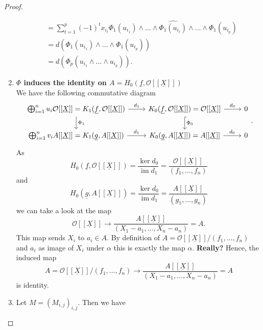\documentclass{article}
\theoremstyle{plain}%
\theoremstyle{definition}
\theoremstyle{remark}
\newcommand{\im}{\operatorname{im}}
\begin{document}
\begin{proof}
\begin{enumerate}
\begin{align*}
                &= \sum_{t=1}^p(-1)^t x_{i_t}\Phi_1(u_{i_1})\!\wedge\!\dots\!
                \wedge\widehat{\Phi_1(u_{i_t})}\!\wedge\!\dots\!\wedge\!\Phi_1(u_{i_p})\\
                &= d(\Phi_1(u_{i_1})\wedge\dots\wedge \Phi_1(u_{i_p}))\\
                &= d(\Phi_p(u_{i_1}\wedge\dots\wedge u_{i_p})).
            \end{align*}
            \item \textbf{\(\Phi\) induces the identity on \(A = H_0(\underline{f}, \mathcal{O}[[\underline{X}]])\)}\\
            We have the following commutative diagram
            \[
                \begin{tikzcd}
                    \bigoplus_{i=1}^n u_i \mathcal{O}[[\underline{X}]] = K_1(\underline{f}, \mathcal{O}[[\underline{X}]]) 
                    \arrow[r, "d_1"] \arrow[d, "\Phi_1"] & K_0(\underline{f}, \mathcal{O}[[\underline{X}]]) \arrow[r, "d_0"] \arrow[d, hook, "\Phi_0"] = \mathcal{O}[[\underline{X}]] & 0\\
                    \bigoplus_{i=1}^n v_i A[[\underline{X}]] = K_1(\underline{g}, A[[\underline{X}]]) 
                    \arrow[r, "d_1"] & K_0(\underline{g}, A[[\underline{X}]]) = A[[\underline{X}]] \arrow[r, "d_0"] & 0
                \end{tikzcd}.
            \]
            As 
            \[
                H_0(\underline{f}, \mathcal{O}[[\underline{X}]]) = \frac{\ker d_0}{\im d_1} 
                = \frac{\mathcal{O}[[\underline{X}]]}{(f_1, \dots, f_n)}
            \] and
            \[
                H_0(\underline{g}, A[[\underline{X}]]) = \frac{\ker d_0}{\im d_1} 
                = \frac{A[[\underline{X}]]}{(g_1, \dots, g_n)}
            \]
            we can take a look at the map
            \[
                \mathcal{O}[[\underline{X}]] \to \frac{A[[\underline{X}]]}{(X_1 - a_1, \dots, X_n - a_n)} = A.
            \]
            This map sends \(X_i\) to \(a_i \in A\).
            By definition of \(A = \mathcal{O}[[\underline{X}]]/(f_1, \dots, f_n)\) and \(a_i\) as image of \(X_i\)
            under \(\alpha\) this is exactly the map \(\alpha\). \textbf{Really?} Hence, the induced map
            \[
                A = \mathcal{O}[[\underline{X}]]/(f_1, \dots, f_n) \to 
                \frac{A[[\underline{X}]]}{(X_1 - a_1, \dots, X_n - a_n)} = A
            \]
            is identity.
            \item Let \(M = (M_{i,j})_{i,j}\). Then we have

\end{enumerate}
\end{proof}
\end{document}
